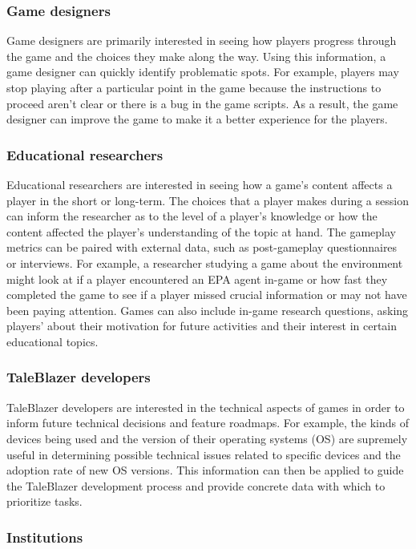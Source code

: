 \subsubsection{Game designers}
Game designers are primarily interested in seeing how players progress through the game and the choices they make along the way. Using this information, a game designer can quickly identify problematic spots. For example, players may stop playing after a particular point in the game because the instructions to proceed aren't clear or there is a bug in the game scripts. As a result, the game designer can improve the game to make it a better experience for the players.

\subsubsection{Educational researchers}

Educational researchers are interested in seeing how a game's content affects a player in the short or long-term. The choices that a player makes during a session can inform the researcher as to the level of a player's knowledge or how the content affected the player's understanding of the topic at hand. The gameplay metrics can be paired with external data, such as post-gameplay questionnaires or interviews. For example, a researcher studying a game about the environment might look at if a player encountered an EPA agent in-game or how fast they completed the game to see if a player missed crucial information or may not have been paying attention. Games can also include in-game research questions, asking players' about their motivation for future activities and their interest in certain educational topics.

\subsubsection{TaleBlazer developers}

TaleBlazer developers are interested in the technical aspects of games in order to inform future technical decisions and feature roadmaps. For example, the kinds of devices being used and the version of their operating systems (OS) are supremely useful in determining possible technical issues related to specific devices and the adoption rate of new OS versions. This information can then be applied to guide the TaleBlazer development process and provide concrete data with which to prioritize tasks. 

\subsubsection{Institutions}

